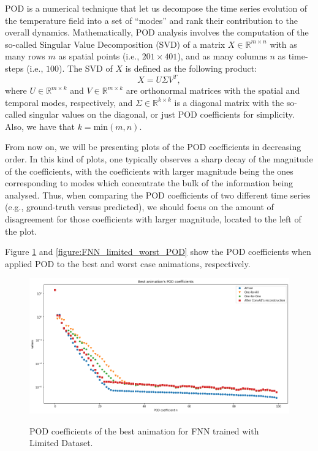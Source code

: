 POD is a numerical technique that let us decompose the time series evolution of the temperature field into a set of ``modes'' and rank their contribution to the overall dynamics. \citep{10.1515_9783110671490-007} Mathematically, POD analysis involves the computation of the so-called Singular Value Decomposition (SVD) of a matrix $X \in \mathbb{R}^{m \times n}$ with as many rows $m$ as spatial points (i.e., $201 \times 401$), and as many columns $n$ as time-steps (i.e., $100$). The SVD of $X$ is defined as the following product:
\begin{equation}
X = U\Sigma V^{T},
\end{equation}
where $U \in \mathbb{R}^{m \times k}$ and $V \in \mathbb{R}^{m \times k}$ are orthonormal matrices with the spatial and temporal modes, respectively, and $\Sigma \in \mathbb{R}^{k \times k} $ is a diagonal matrix with the so-called singular values on the diagonal, or just POD coefficients for simplicity. Also, we have that $k=\mathrm{min}(m,n)$.

From now on, we will be presenting plots of the POD coefficients in decreasing order. In this kind of plots, one typically observes a sharp decay of the magnitude of the coefficients, with the coefficients with larger magnitude being the ones corresponding to modes which concentrate the bulk of the information being analysed. Thus, when comparing the POD coefficients of two different time series (e.g., ground-truth versus predicted), we should focus on the amount of disagreement for those coefficients with larger magnitude, located to the left of the plot. 

Figure \ref{figure:FNN_limited_best_POD} and \ref{figure:FNN_limited_worst_POD} show the POD coefficients when applied POD to the best and worst case animations, respectively.

\begin{figure}[H]
    \centering
    \caption{POD coefficients of the best animation for FNN trained with Limited Dataset.}
    \includegraphics[scale=0.4]{figures/mantle_convection_images/limited_dataset/FNN_Best_POD.png}
    \label{figure:FNN_limited_best_POD}
\end{figure}

